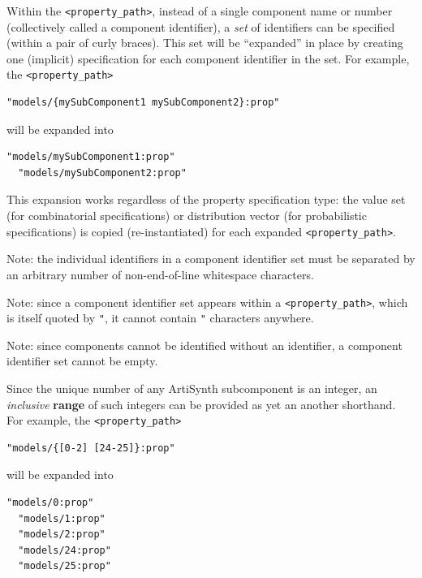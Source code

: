 \documentclass{article}
\begin{document}
Within the {\tt <property\_path>}, instead of a single component name or number (collectively called a component identifier), a \textit{set} of identifiers can be specified (within a pair of curly braces). This set will be ``expanded'' in place by creating one (implicit) specification for each component identifier in the set. For example, the {\tt <property\_path>}

\begin{lstlisting}[]
  "models/{mySubComponent1 mySubComponent2}:prop"
\end{lstlisting}

will be expanded into

\begin{lstlisting}[]
  "models/mySubComponent1:prop"
  "models/mySubComponent2:prop"
\end{lstlisting}

This expansion works regardless of the property specification type: the value set (for combinatorial specifications) or distribution vector (for probabilistic specifications) is copied (re-instantiated) for each expanded {\tt <property\_path>}.

\begin{sideblock}
Note: the individual identifiers in a component identifier set must be separated by an arbitrary number of non-end-of-line whitespace characters.
\end{sideblock}

\begin{sideblock}
Note: since a component identifier set appears within a {\tt <property\_path>}, which is itself quoted by {\tt "}, it cannot contain {\tt "} characters anywhere.
\end{sideblock}

\begin{sideblock}
Note: since components cannot be identified without an identifier, a component identifier set cannot be empty.
\end{sideblock}

Since the unique number of any ArtiSynth subcomponent is an integer, an \textit{inclusive} \textbf{range} of such integers can be provided as yet an another shorthand. For example, the {\tt <property\_path>}

\begin{lstlisting}[]
  "models/{[0-2] [24-25]}:prop"
\end{lstlisting}

will be expanded into

\begin{lstlisting}[]
  "models/0:prop"
  "models/1:prop"
  "models/2:prop"
  "models/24:prop"
  "models/25:prop"
\end{lstlisting}
\end{document}
